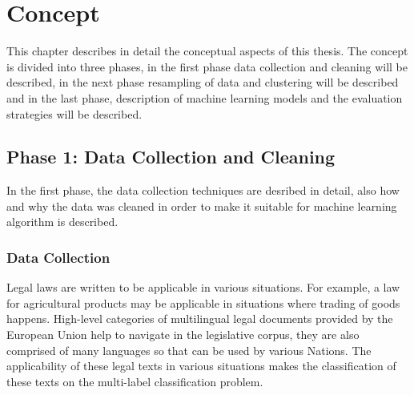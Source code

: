 \chapter{Concept}
\label{ch:concept}

This chapter describes in detail the conceptual aspects of this thesis. The concept is divided into three phases, in the first phase data collection and cleaning will be described, in the next phase resampling of data and clustering will be described and in the last phase, description of machine learning models and the evaluation strategies will be described.

\section{Phase 1: Data Collection and Cleaning}
In the first phase, the data collection techniques are desribed in detail, also how and why the data was cleaned in order to make it suitable for machine learning algorithm is described. 

\subsection*{Data Collection}
Legal laws are written to be applicable in various situations. For example, a law for agricultural products may be applicable in situations where trading of goods happens.  High-level categories of multilingual legal documents provided by the European Union help to navigate in the legislative corpus,  they are also comprised of many languages so that can be used by various Nations. The applicability of these legal texts in various situations makes the classification of these texts on the multi-label classification problem.

